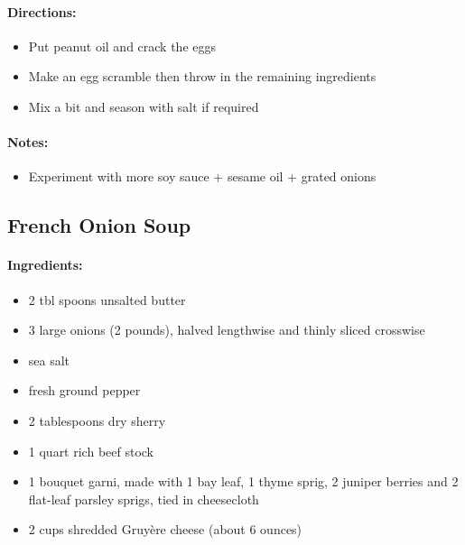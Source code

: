 \documentclass{article}
\begin{document}
\paragraph{Directions:}
\begin{itemize}
    \item Put peanut oil and crack the eggs
    \item Make an egg scramble then throw in the remaining ingredients
    \item Mix a bit and season with salt if required
\end{itemize}

\paragraph{Notes:}
\begin{itemize}
    \item Experiment with more soy sauce + sesame oil + grated onions
\end{itemize}

\subsection{French Onion Soup}

\paragraph{Ingredients:}
\begin{itemize}
    \item 2 tbl spoons unsalted butter
    \item 3 large onions (2 pounds), halved lengthwise and thinly sliced crosswise
    \item sea salt
    \item fresh ground pepper
    \item 2 tablespoons dry sherry
    \item 1 quart rich beef stock
    \item 1 bouquet garni, made with 1 bay leaf, 1 thyme sprig, 2 juniper berries and 2 flat-leaf parsley sprigs, tied in cheesecloth
    \item 2 cups shredded Gruyère cheese (about 6 ounces)
\end{itemize}
\end{document}
